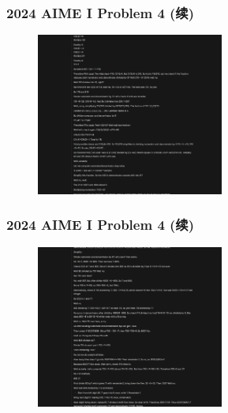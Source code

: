 \begin{frame}
    \frametitle{2024 AIME I Problem 4 (续)}
    \begin{figure}
        \centering
        \includegraphics[width=0.55\textwidth]{./pic/3.png} %
        \label{fig:aime_solution_1}
    \end{figure}
\end{frame}

\begin{frame}
    \frametitle{2024 AIME I Problem 4 (续)}
    \begin{figure}
        \centering
        \includegraphics[width=0.55\textwidth]{./pic/4.png} %
        \label{fig:aime_solution_2}
    \end{figure}
\end{frame}

